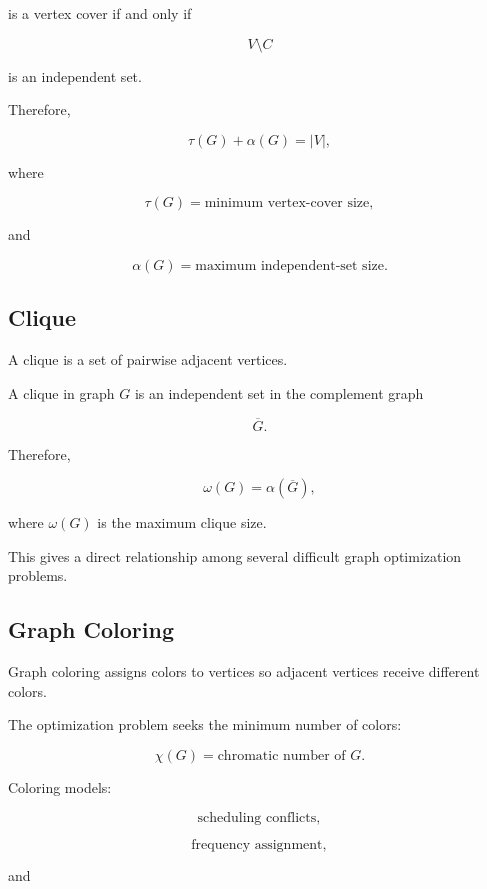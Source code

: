 is a vertex cover if and only if

\[
V\setminus C
\]

is an independent set.

Therefore,

\[
\boxed{
\tau(G)+\alpha(G)=|V|,
}
\]

where

\[
\tau(G)
=
\text{minimum vertex-cover size},
\]

and

\[
\alpha(G)
=
\text{maximum independent-set size}.
\]

\subsection{Clique}
\label{subsec:clique-optimization}

A clique is a set of pairwise adjacent vertices.

A clique in graph \(G\) is an independent set in the complement graph

\[
\overline{G}.
\]

Therefore,

\[
\boxed{
\omega(G)
=
\alpha(\overline{G}),
}
\]

where \(\omega(G)\) is the maximum clique size.

This gives a direct relationship among several difficult graph
optimization problems.

\subsection{Graph Coloring}
\label{subsec:graph-coloring-optimization}

Graph coloring assigns colors to vertices so adjacent vertices receive
different colors.

The optimization problem seeks the minimum number of colors:

\[
\boxed{
\chi(G)
=
\text{chromatic number of }G.
}
\]

Coloring models:

\[
\boxed{
\text{scheduling conflicts},
}
\]

\[
\boxed{
\text{frequency assignment},
}
\]

and

